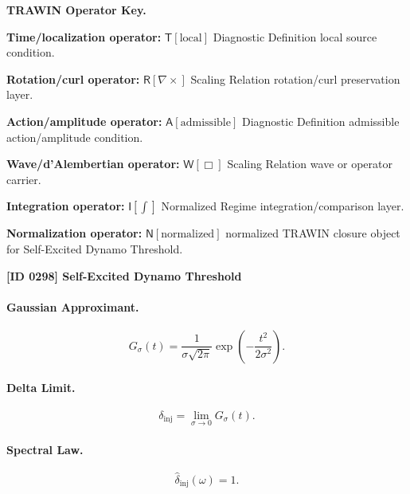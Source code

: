 \par\vspace{0.45\baselineskip}
\noindent\begin{minipage}[t]{\linewidth}
\begingroup
\small
\raggedright
\textbf{TRAWIN Operator Key.}\par
\noindent\textbf{Time/localization operator:} $\mathsf{T}\!\left[\mathrm{local}\right]$ Diagnostic Definition local source condition.\par
\noindent\textbf{Rotation/curl operator:} $\mathsf{R}\!\left[\nabla\times\right]$ Scaling Relation rotation/curl preservation layer.\par
\noindent\textbf{Action/amplitude operator:} $\mathsf{A}\!\left[\mathrm{admissible}\right]$ Diagnostic Definition admissible action/amplitude condition.\par
\noindent\textbf{Wave/d'Alembertian operator:} $\mathsf{W}\!\left[\Box\right]$ Scaling Relation wave or operator carrier.\par
\noindent\textbf{Integration operator:} $\mathsf{I}\!\left[\int\right]$ Normalized Regime integration/comparison layer.\par
\noindent\textbf{Normalization operator:} $\mathsf{N}\!\left[\mathrm{normalized}\right]$ normalized TRAWIN closure object for Self-Excited Dynamo Threshold.\par
\endgroup
\end{minipage}

\clearpage
\noindent\textbf{[ID 0298] Self-Excited Dynamo Threshold}\par
\vspace{0.35em}
\paragraph{Gaussian Approximant.}
\begin{equation}
G_{\sigma}(t)
=
\frac{1}{\sigma\sqrt{2\pi}}
\exp\left(
-\frac{t^2}{2\sigma^2}
\right).
\end{equation}

\paragraph{Delta Limit.}
\begin{equation}
\delta_{\mathrm{inj}}
=
\lim_{\sigma\to0}G_{\sigma}(t).
\end{equation}

\paragraph{Spectral Law.}
\begin{equation}
\widehat{\delta}_{\mathrm{inj}}(\omega)=1.
\end{equation}

